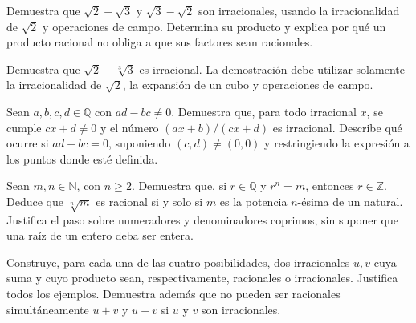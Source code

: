 \begin{samepage}
\begin{problem}\label{prob:reto-numeros-05}
Demuestra que $\sqrt2+\sqrt3$ y $\sqrt3-\sqrt2$ son irracionales, usando la irracionalidad de $\sqrt2$ y operaciones de campo. Determina su producto y explica por qué un producto racional no obliga a que sus factores sean racionales.~\cite{mseRadicales}
\end{problem}
\end{samepage}
\par{}

\begin{samepage}
\begin{problem}\label{prob:reto-numeros-06}
Demuestra que $\sqrt2+\sqrt[3]{3}$ es irracional. La demostración debe utilizar solamente la irracionalidad de $\sqrt2$, la expansión de un cubo y operaciones de campo.~\cite{mseRaizCubica}
\end{problem}
\end{samepage}
\par{}

\begin{samepage}
\begin{problem}\label{prob:reto-numeros-07}
Sean $a,b,c,d\in\mathbb Q$ con $ad-bc\ne0$. Demuestra que, para todo irracional $x$, se cumple $cx+d\ne0$ y el número $(ax+b)/(cx+d)$ es irracional. Describe qué ocurre si $ad-bc=0$, suponiendo $(c,d)\ne(0,0)$ y restringiendo la expresión a los puntos donde esté definida.~\cite{mseHomografia}
\end{problem}
\end{samepage}
\par{}

\begin{samepage}
\begin{problem}\label{prob:reto-numeros-08}
Sean $m,n\in\mathbb N$, con $n\ge2$. Demuestra que, si $r\in\mathbb Q$ y $r^n=m$, entonces $r\in\mathbb Z$. Deduce que $\sqrt[n]{m}$ es racional si y solo si $m$ es la potencia $n$-ésima de un natural. Justifica el paso sobre numeradores y denominadores coprimos, sin suponer que una raíz de un entero deba ser entera.
\end{problem}
\end{samepage}
\par{}

\begin{samepage}
\begin{problem}\label{prob:reto-numeros-09}
Construye, para cada una de las cuatro posibilidades, dos irracionales $u,v$ cuya suma y cuyo producto sean, respectivamente, racionales o irracionales. Justifica todos los ejemplos. Demuestra además que no pueden ser racionales simultáneamente $u+v$ y $u-v$ si $u$ y $v$ son irracionales.
\end{problem}
\end{samepage}
\par{}

